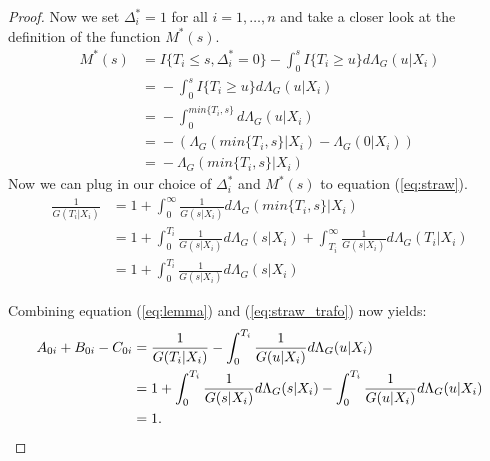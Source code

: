 \documentclass[12pt, a4paper]{scrartcl}
\theoremstyle{definition}
\theoremstyle{plain}
\numberwithin{equation}{section}
\numberwithin{figure}{section}
\numberwithin{table}{section}
\begin{document}
\begin{appendices}
\begin{proof}
			Now we set $ \Delta^*_i=1$ for all $i=1,\dots,n$ and take a closer look at the definition of the function $M^*(s)$.
			\begin{equation*}
			\begin{split}
			M^*(s) &={} I\{T_i \leq s, \Delta^*_i = 0\} - \int_{0}^s I\{T_i\geq u\}d\Lambda_G(u\vert X_i)\\
			& ={} - \int_{0}^s I\{T_i\geq u\}d\Lambda_G(u\vert X_i)\\
			& ={} - \int_0^{min\{T_i,s\}}d\Lambda_G(u\vert X_i)\\
			& ={} - \left(\Lambda_G(min\{T_i,s\}\vert X_i)-\Lambda_G(0\vert X_i)\right)\\
			& ={} - \Lambda_G(min\{T_i,s\}\vert X_i)
			\end{split}
			\end{equation*}
			Now we can plug in our choice of $\Delta^*_i$ and $M^*(s)$ to equation (\ref{eq:straw}).
			\begin{equation}\label{eq:straw_trafo}
			\begin{split}
			\frac{1}{G(T_i\vert X_i)} &={} 1 + \int_{0}^{\infty} \frac{1}{G(s\vert X_i)} d\Lambda_G(min\{T_i,s\}\vert X_i)\\
			&={} 1 + \int_{0}^{T_i} \frac{1}{G(s\vert X_i)} d\Lambda_G(s\vert X_i) + \int_{T_i}^{\infty} \frac{1}{G(s\vert X_i)} d\Lambda_G(T_i\vert X_i)\\
			& ={} 1 + \int_{0}^{T_i} \frac{1}{G(s\vert X_i)} d\Lambda_G(s\vert X_i)
			\end{split}
			\end{equation}
		
			Combining equation (\ref{eq:lemma}) and (\ref{eq:straw_trafo}) now yields:
			\begin{equation*}
			\begin{split}
			A_{0i}+B_{0i}-C_{0i}&={}\frac{1}{G(T_i \vert X_i)} - \int_{0}^{T_i}\frac{1}{G(u\vert X_i)}d\Lambda_G(u\vert X_i)\\
			&={} 1 + \int_{0}^{T_i} \frac{1}{G(s\vert X_i)} d\Lambda_G(s\vert X_i)  - \int_{0}^{T_i}\frac{1}{G(u\vert X_i)}d\Lambda_G(u\vert X_i)\\
			&={} 1. \qedhere
			\end{split}
			\end{equation*}
		\end{proof}
	
		
		
	\end{appendices}
	
\end{document}
